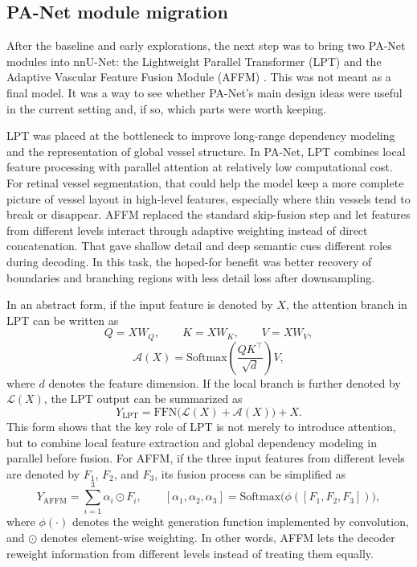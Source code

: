 \documentclass[a4paper,12pt]{article}
\begin{document}
\subsection{PA-Net module migration}

After the baseline and early explorations, the next step was to bring two PA-Net modules into nnU-Net: the Lightweight Parallel Transformer (LPT) and the Adaptive Vascular Feature Fusion Module (AFFM) \cite{luo2025panet}. This was not meant as a final model. It was a way to see whether PA-Net's main design ideas were useful in the current setting and, if so, which parts were worth keeping.

LPT was placed at the bottleneck to improve long-range dependency modeling and the representation of global vessel structure. In PA-Net, LPT combines local feature processing with parallel attention at relatively low computational cost. For retinal vessel segmentation, that could help the model keep a more complete picture of vessel layout in high-level features, especially where thin vessels tend to break or disappear. AFFM replaced the standard skip-fusion step and let features from different levels interact through adaptive weighting instead of direct concatenation. That gave shallow detail and deep semantic cues different roles during decoding. In this task, the hoped-for benefit was better recovery of boundaries and branching regions with less detail loss after downsampling.

In an abstract form, if the input feature is denoted by \(X\), the attention branch in LPT can be written as
\[
Q = XW_Q,\qquad K = XW_K,\qquad V = XW_V,
\]
\[
\mathcal{A}(X) = \mathrm{Softmax}\left(\frac{QK^{\top}}{\sqrt{d}}\right)V,
\]
where \(d\) denotes the feature dimension. If the local branch is further denoted by \(\mathcal{L}(X)\), the LPT output can be summarized as
\[
Y_{\mathrm{LPT}} = \mathrm{FFN}\big(\mathcal{L}(X) + \mathcal{A}(X)\big) + X.
\]
This form shows that the key role of LPT is not merely to introduce attention, but to combine local feature extraction and global dependency modeling in parallel before fusion. For AFFM, if the three input features from different levels are denoted by \(F_1\), \(F_2\), and \(F_3\), its fusion process can be simplified as
\[
Y_{\mathrm{AFFM}} = \sum_{i=1}^{3}\alpha_i \odot F_i,\qquad
[\alpha_1,\alpha_2,\alpha_3] = \mathrm{Softmax}\big(\phi([F_1,F_2,F_3])\big),
\]
where \(\phi(\cdot)\) denotes the weight generation function implemented by convolution, and \(\odot\) denotes element-wise weighting. In other words, AFFM lets the decoder reweight information from different levels instead of treating them equally.
\end{document}
